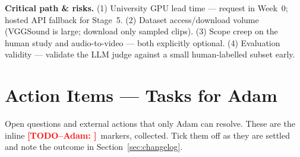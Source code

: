 \documentclass[11pt,a4paper]{article}
\newcommand{\TODO}[1]{\textcolor{red}{\textbf{[TODO--Adam: #1]}}}
\begin{document}
\noindent\textbf{Critical path \& risks.} (1) University GPU lead time --- request in Week~0; hosted
API fallback for Stage~5. (2) Dataset access/download volume (VGGSound is large; download only
sampled clips). (3) Scope creep on the human study and audio-to-video --- both explicitly optional.
(4) Evaluation validity --- validate the LLM judge against a small human-labelled subset early.

\section{Action Items --- Tasks for Adam}\label{sec:tasks}
Open questions and external actions that only Adam can resolve. These are the inline
\TODO{}\ markers, collected. Tick them off as they are settled and note the outcome in
Section~\ref{sec:changelog}.
\end{document}
